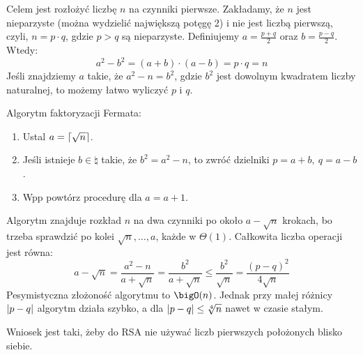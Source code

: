 Celem jest rozłożyć liczbę \( n \) na czynniki pierwsze. Zakładamy, że \( n \) jest nieparzyste (można wydzielić największą potęgę 2) i nie jest liczbą pierwszą, czyli, \( n = p \cdot q \), gdzie \( p > q \) są nieparzyste.
Definiujemy \( a = \frac{p+q}{2} \) oraz \( b = \frac{p-q}{2} \). Wtedy:
\[
    a^2 - b^2 = (a+b) \cdot (a-b) = p \cdot q = n
\]
Jeśli znajdziemy \( a \) takie, że \( a^2 - n = b^2 \), gdzie \( b^2 \) jest dowolnym kwadratem liczby naturalnej, to możemy łatwo wyliczyć \( p \) i \( q \).

\begin{greyframe}
    Algorytm faktoryzacji Fermata:
    \begin{enumerate}
        \item Ustal \( a = \left\lceil\sqrt{n}\right\rceil \).
        \item Jeśli istnieje \( b \in \natural \) takie, że \( b^2 = a^2 - n \), to zwróć dzielniki \( p = a+b, \ q = a-b \).
        \item Wpp powtórz procedurę dla \( a = a + 1\).
    \end{enumerate}
\end{greyframe}

Algorytm znajduje rozkład \( n \) na dwa czynniki po około \( a - \sqrt{n} \) krokach, bo trzeba sprawdzić po kolei \( \sqrt{n}, \dots, a \), każde w \( \Theta(1) \).
Całkowita liczba operacji jest równa:
\[
    a - \sqrt{n} = \frac{a^2 - n}{a + \sqrt{n}} = \frac{b^2}{a + \sqrt{n}} \leq \frac{b^2}{\sqrt{n}} = \frac{(p-q)^2}{4\sqrt{n}}
\]
Pesymistyczna złożoność algorytmu to \( \bigO(n) \). Jednak przy małej różnicy \( \left\lvert p - q\right\rvert \) algorytm działa szybko, a dla  \( \left\lvert p-q\right\rvert \leq \sqrt[4]{n} \) nawet w czasie stałym.

Wniosek jest taki, żeby do RSA nie używać liczb pierwszych położonych blisko siebie.